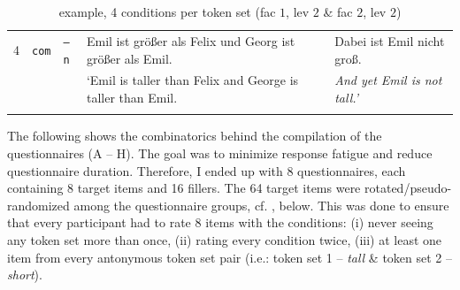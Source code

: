 \documentclass[output=paper
,modfonts
,nonflat]{langsci/langscibook}
\begin{document}
\begin{table}
\begin{tabular}{lllll}
\midrule
4 & \texttt{com} & \texttt{\footnotesize{--}n} & Emil ist größer als Felix \hspace{0.65pt} und Georg ist \hspace{16pt} größer als Emil. & Dabei ist Emil nicht groß.   \\
 & & & {`Emil is taller than Felix \hspace{2pt} and George is \hspace{19pt} taller than Emil.} & \textit{And yet Emil is not tall.'}   \\
\lspbottomrule
\end{tabular}
\caption{example, 4 conditions  per token set (fac $1$, lev $2$ \& fac $2$, lev $2$)}
\label{tab:emil_example}
\end{table}


\noindent The following shows the combinatorics behind the compilation of the questionnaires (A -- H). The goal was to minimize response fatigue and reduce questionnaire duration. Therefore, I ended up with 8 questionnaires, each containing 8 target items and 16 fillers. The 64 target items were rotated/pseudo-randomized among the questionnaire groups, cf. , below. This was done to ensure that every participant had to rate 8 items with the conditions: (i) never seeing any token set more than once, (ii) rating every condition twice, (iii) at least one item from every antonymous token set pair (i.e.: token set 1 -- \textit{tall} \& token set 2 -- \textit{short}).
\end{document}
